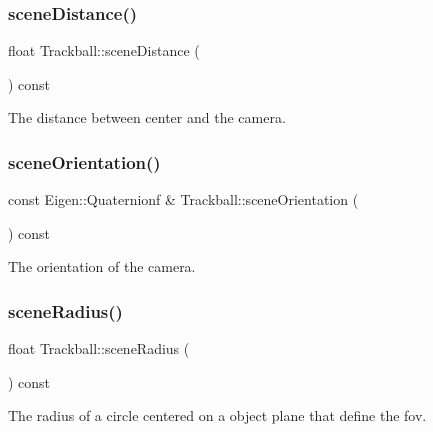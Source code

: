 \mbox{\label{class_trackball_a9b40eb48561c425f30498a8a9f10ca1f}} 
\subsubsection{\texorpdfstring{scene\+Distance()}{sceneDistance()}}
{\footnotesize\ttfamily float Trackball\+::scene\+Distance (\begin{DoxyParamCaption}{ }\end{DoxyParamCaption}) const}



The distance between {\ttfamily center} and the camera. 

\mbox{\label{class_trackball_a3ee1a7c88f90ac00ffab791dd8704ef2}} 
\subsubsection{\texorpdfstring{scene\+Orientation()}{sceneOrientation()}}
{\footnotesize\ttfamily const Eigen\+::\+Quaternionf \& Trackball\+::scene\+Orientation (\begin{DoxyParamCaption}{ }\end{DoxyParamCaption}) const}



The orientation of the camera. 

\mbox{\label{class_trackball_acd26e3c6e72d935e556e6b10bd2a0c1d}} 
\subsubsection{\texorpdfstring{scene\+Radius()}{sceneRadius()}}
{\footnotesize\ttfamily float Trackball\+::scene\+Radius (\begin{DoxyParamCaption}{ }\end{DoxyParamCaption}) const}



The radius of a circle centered on a object plane that define the fov. 

